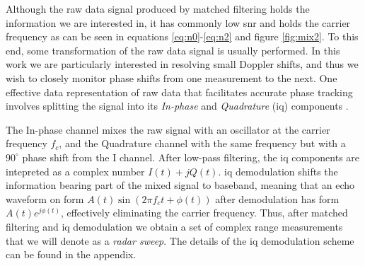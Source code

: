 Although the raw data signal produced by matched filtering holds the information we are interested in, it has commonly low \gls{snr} \citep{richards_2014} and holds the carrier frequency as can be seen in equations \eqref{eq:n0}-\eqref{eq:n2} and figure \ref{fig:mix2}. To this end, some transformation of the raw data signal is usually performed. In this work we are particularly interested in resolving small Doppler shifts, and thus we wish to closely monitor phase shifts from one measurement to the next. One effective data representation of raw data that facilitates accurate phase tracking involves splitting the signal into its \emph{In-phase} and \emph{Quadrature} (\gls{iq}) components \citep{lien_gillian_karagozler_amihood_schwesig_olson_raja_poupyrev_2016}. 

The In-phase channel mixes the raw signal with an oscillator at the carrier frequency $f_c$, and the Quadrature channel with the same frequency but with a $90^\circ$ phase shift from the I channel. After low-pass filtering, the \gls{iq} components are intepreted as a complex number $I(t) + jQ(t)$. \gls{iq} demodulation shifts the information bearing part of the mixed signal to baseband, meaning that an echo waveform on form $A(t)\sin(2\pi f_c t + \phi(t))$ after demodulation has form $A(t)e^{j\phi(t)}$, effectively eliminating the carrier frequency. Thus, after matched filtering and \gls{iq} demodulation we obtain a set of complex range measurements that we will denote as a \emph{radar sweep}. The details of the \gls{iq} demodulation scheme can be found in the appendix. 





